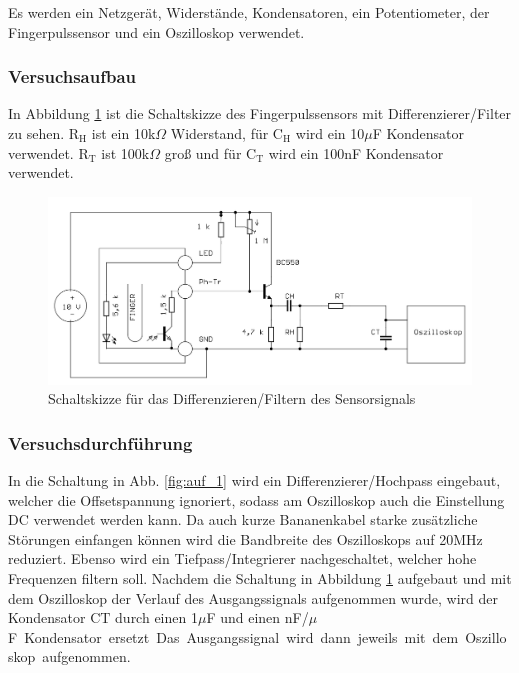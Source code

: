 \documentclass[12pt,a4paper]{article}
\begin{document}
Es werden ein Netzgerät, Widerstände, Kondensatoren, ein Potentiometer, der Fingerpulssensor und ein Oszilloskop verwendet.

\subsubsection*{Versuchsaufbau}

In Abbildung \ref{fig:auf_2} ist die Schaltskizze des Fingerpulssensors mit Differenzierer/Filter zu sehen. R$_\text{H}$ ist ein 10k$\Omega$ Widerstand, für C$_\text{H}$ wird ein 10$\mu$F Kondensator verwendet.  R$_\text{T}$ ist 100k$\Omega$ groß und für C$_\text{T}$ wird ein 100nF Kondensator verwendet.

\begin{figure}[H] 
	\centering
	\includegraphics[scale = 0.3]{auf_2.png}
	\caption[Schaltskizze für das Differenzieren/Filtern des Sensorsignals]{Schaltskizze für das Differenzieren/Filtern des Sensorsignals\footnotemark}
	\label{fig:auf_2}
\end{figure}

\subsubsection*{Versuchsdurchführung}
In die Schaltung  in Abb. \ref{fig:auf_1} wird ein Differenzierer/Hochpass  eingebaut, welcher die Offsetspannung ignoriert, sodass am Oszilloskop auch die Einstellung DC verwendet werden kann. Da auch kurze Bananenkabel starke zusätzliche Störungen einfangen können wird die Bandbreite des Oszilloskops auf 20MHz reduziert. Ebenso wird ein Tiefpass/Integrierer nachgeschaltet, welcher hohe Frequenzen filtern soll.
Nachdem die Schaltung in Abbildung \ref{fig:auf_2} aufgebaut und mit dem Oszilloskop der Verlauf des Ausgangssignals aufgenommen wurde, wird der Kondensator C$\text{T}$ durch einen 1$\mu$F  und einen \unit[10]{nF}/\unit[0,1]{$\mu$F} Kondensator ersetzt. Das Ausgangssignal wird dann jeweils mit dem Oszilloskop aufgenommen. 
\end{document}

